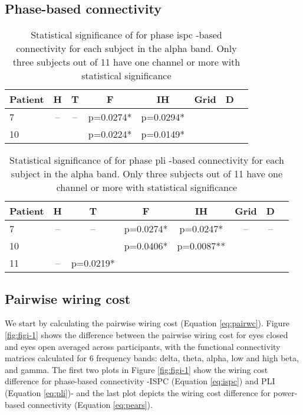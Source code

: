 \documentclass[11pt, onecolumn]{article}
\begin{document}
\subsection{Phase-based connectivity}
\begin{table}
\centering
\begin{tabular}{l*{6}{c}r}
Patient & H & T & F & IH & Grid & D  \\
\hline
7 &  -- & -- &  p=0.0274* &   p=0.0294* &  &  \\ 
10 &  &  & p=0.0224* & p=0.0149* & & \\ 
\end{tabular}
\caption{\label{Table:phaseconnectispc} 
Statistical significance of for phase ispc -based connectivity for each subject in the alpha band. Only three subjects out of 11 have one channel or more with statistical significance 
}
\end{table}

\begin{table}
\centering
\begin{tabular}{l*{6}{c}r}
Patient & H & T & F & IH & Grid & D  \\
\hline
7 & -- & -- &  p=0.0274* &  p=0.0247* & -- & -- \\ 
10 &  &  &   p=0.0406* &   p=0.0087** &  & \\ 
11 & --  &  p=0.0219* &  &  &  & \\
\end{tabular}
\caption{\label{Table:phaseconnectpli} 
Statistical significance of for phase pli -based connectivity for each subject in the alpha band. Only three subjects out of 11 have one channel or more with statistical significance 
}
\end{table}


\subsection{Pairwise wiring cost}
We start by calculating the pairwise wiring cost (Equation \ref{eq:pairwc}). Figure \ref{fig:figi-1} shows the difference between the pairwise wiring cost for eyes closed and eyes open averaged across participants, with the functional connectivity matrices calculated for 6 frequency bands: delta, theta, alpha, low and high beta, and gamma. 
The first two plots in Figure \ref{fig:figi-1} show the wiring cost difference for phase-based connectivity -ISPC (Equation \ref{eq:ispc}) and PLI (Equation \ref{eq:pli})- and the last plot depicts the wiring cost difference for power-based connectivity (Equation \ref{eq:pears}).
 
\end{document}
